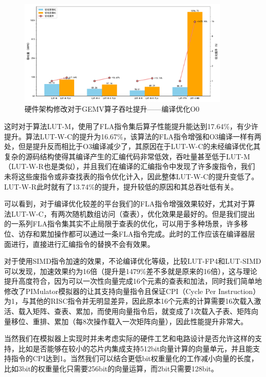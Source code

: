 \begin{figure}[!htbp]
    \centering
    \includegraphics[width=0.9\textwidth]{figures/Exp2-2.pdf}
    \caption{硬件架构修改对于GEMV算子吞吐提升——编译优化O0}
	\label{EXP2-2}
\end{figure}

这时对于算法LUT-M，使用了FLA指令集后算子性能提升能达到17.64\%，有少许提升。算法LUT-W-C的提升为16.67\%，该算法的FLA指令增强和O3编译一样有两处，但是提升反而相比于O3编译减少了，其原因在于LUT-W-C的未经编译优化其复杂的源码结构使得其编译产生的汇编代码非常低效，吞吐量甚至低于LUT-M（LUT-W-R也是类似），并且我们在编译的汇编指令中发现了许多废指令，我们未将这些废指令或非查找表的指令优化计入，因此整体LUT-W-C的提升变低了。LUT-W-R此时就有了13.74\%的提升，提升较低的原因和其总吞吐低有关。

可以看到，对于编译优化较差的平台我们的FLA指令增强效果较好，尤其对于算法LUT-W-C，有两次随机数组访问（查表），优化效果是最好的。但是我们提出的一系列FLA指令集其实不止局限于查表的优化，可以用于多种场景，许多移位、访存和累加操作都可以通过一条FLA指令完成。此时的工作应该在编译器层面进行，直接进行汇编指令的替换不会有效果。

对于使用SIMD指令加速的效果，不论编译优化等级，比较LUT-FP4和LUT-SIMD可以发现，加速效果约为16倍（提升是1479\%差不多就是原来的16倍），这与理论提升高度符合，因为可以一次性向量完成16个元素的查表和加法，同时我们简单地修改了PIMulator模拟器的让其支持向量指令且保证CPI（Cycle Per Instruction）为1，与其他的RISC指令并无明显差异，因此原本16个元素的计算需要16次载入激活、载入矩阵、查表、累加，而使用向量指令后，就变成了1次载入子表、矩阵向量移位、重排、累加（每8次操作载入一次矩阵向量），因此性能提升非常大。

当然我们在模拟器上实现时并未考虑实际的硬件工艺和电路设计是否允许这样的支持，比如是否能够在较小的芯片内集成支持512bit向量计算的向量单元，并且能支持指令的CPI达到1。当然我们可以结合更低bit权重量化的工作减小向量的长度，比如3bit的权重量化只需要256bit的向量运算，而2bit只需要128bit。

